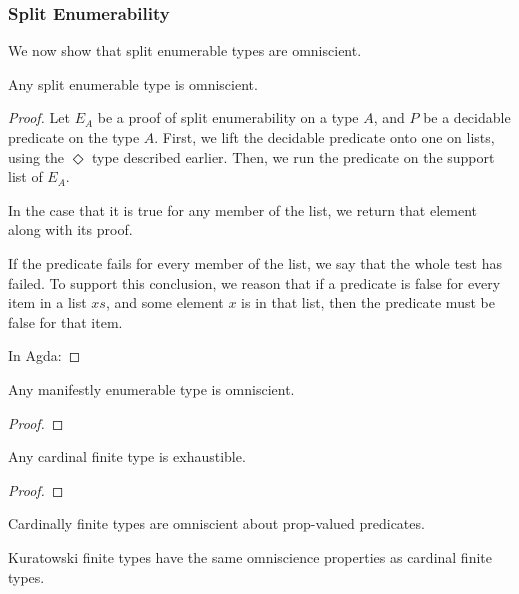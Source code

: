 \subsubsection{Split Enumerability}
We now show that split enumerable types are omniscient.
\begin{rm-theorem}
  Any split enumerable type is omniscient.
\end{rm-theorem}
\begin{proof}
  Let \(E_A\) be a proof of split enumerability on a type \(A\), and \(P\) be a
  decidable predicate on the type \(A\).
  First, we lift the decidable predicate onto one on lists, using the
  \(\Diamond\) type described earlier.
  Then, we run the predicate on the support list of \(E_A\).

  In the case that it is true for any member of the list, we return that element
  along with its proof.

  If the predicate fails for every member of the list, we say that the whole
  test has failed.
  To support this conclusion, we reason that if a predicate is false for every
  item in a list \(\mathit{xs}\), and some element \(x\) is in that list, then
  the predicate must be false for that item.

  In Agda:
\end{proof}
\begin{rm-theorem}
  Any manifestly enumerable type is omniscient.
\end{rm-theorem}
\begin{proof}
\end{proof}
\begin{rm-theorem}
  Any cardinal finite type is exhaustible.
\end{rm-theorem}
\begin{proof}
\end{proof}
\begin{rm-theorem}
  Cardinally finite types are omniscient about prop-valued predicates.
\end{rm-theorem}
\begin{rm-theorem}
  Kuratowski finite types have the same omniscience properties as cardinal
  finite types.
\end{rm-theorem}

